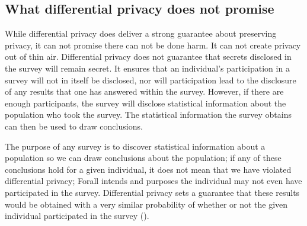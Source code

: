 \documentclass[11pt]{article}
\theoremstyle{definition}
\begin{document}
\subsection{What differential privacy does not promise}
While differential privacy does deliver a strong guarantee about preserving privacy, it can not promise there can not be done harm. It can not create privacy out of thin air. Differential privacy does not guarantee that secrets disclosed in the survey will remain secret. It ensures that an individual's participation in a survey will not in itself be disclosed, nor will participation lead to the disclosure of any results that one has answered within the survey. However, if there are enough participants, the survey will disclose statistical information about the population who took the survey. The statistical information the survey obtains can then be used to draw conclusions.

The purpose of any survey is to discover statistical information about a population so we can draw conclusions about the population; if any of these conclusions hold for a given individual, it does not mean that we have violated differential privacy; Forall intends and purposes the individual may not even have participated in the survey. Differential privacy sets a guarantee that these results would be obtained with a very similar probability of whether or not the given individual participated in the survey (\cite[22]{algo_fun}). 
\end{document}
